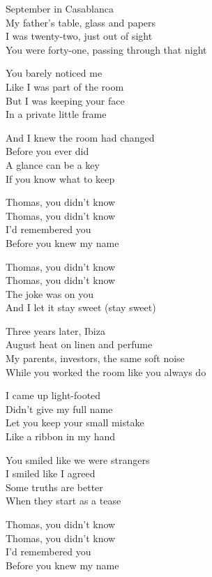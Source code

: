 \begin{lyrics}
September in Casablanca\\
My father's table, glass and papers\\
I was twenty-two, just out of sight\\
You were forty-one, passing through that night

You barely noticed me\\
Like I was part of the room\\
But I was keeping your face\\
In a private little frame

And I knew the room had changed\\
Before you ever did\\
A glance can be a key\\
If you know what to keep

Thomas, you didn't know\\
Thomas, you didn't know\\
I'd remembered you\\
Before you knew my name

Thomas, you didn't know\\
Thomas, you didn't know\\
The joke was on you\\
And I let it stay sweet
(stay sweet)

Three years later, Ibiza\\
August heat on linen and perfume\\
My parents, investors, the same soft noise\\
While you worked the room like you always do

I came up light-footed\\
Didn't give my full name\\
Let you keep your small mistake\\
Like a ribbon in my hand

You smiled like we were strangers\\
I smiled like I agreed\\
Some truths are better\\
When they start as a tease

Thomas, you didn't know\\
Thomas, you didn't know\\
I'd remembered you\\
Before you knew my name


\end{lyrics}
